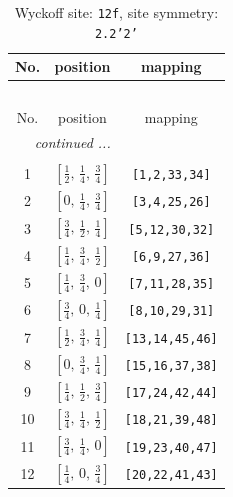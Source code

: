 \documentclass[fleqn,8pt]{jsarticle}
\begin{document}
\begin{longtable}{ccc}
\caption{Wyckoff site: {\tt 12f}, site symmetry: {\tt 2.2'2'}}
 \\
 \hline \hline
No. & position & mapping \\ \hline \endfirsthead

\multicolumn{2}{l}{\tablename\ \thetable{}} \\
 \hline \hline
No. & position & mapping \\ \hline \endhead

 \hline \hline
\multicolumn{2}{r}{\footnotesize\it continued ...} \\ \endfoot

 \hline \hline
\multicolumn{2}{r}{} \\ \endlastfoot

1 & $\left[ \frac{1}{2},\, \frac{1}{4},\, \frac{3}{4} \right]$ & {\tt [1,2,33,34]} \\ \hline
2 & $\left[ 0,\, \frac{1}{4},\, \frac{3}{4} \right]$ & {\tt [3,4,25,26]} \\ \hline
3 & $\left[ \frac{3}{4},\, \frac{1}{2},\, \frac{1}{4} \right]$ & {\tt [5,12,30,32]} \\ \hline
4 & $\left[ \frac{1}{4},\, \frac{3}{4},\, \frac{1}{2} \right]$ & {\tt [6,9,27,36]} \\ \hline
5 & $\left[ \frac{1}{4},\, \frac{3}{4},\, 0 \right]$ & {\tt [7,11,28,35]} \\ \hline
6 & $\left[ \frac{3}{4},\, 0,\, \frac{1}{4} \right]$ & {\tt [8,10,29,31]} \\ \hline
7 & $\left[ \frac{1}{2},\, \frac{3}{4},\, \frac{1}{4} \right]$ & {\tt [13,14,45,46]} \\ \hline
8 & $\left[ 0,\, \frac{3}{4},\, \frac{1}{4} \right]$ & {\tt [15,16,37,38]} \\ \hline
9 & $\left[ \frac{1}{4},\, \frac{1}{2},\, \frac{3}{4} \right]$ & {\tt [17,24,42,44]} \\ \hline
10 & $\left[ \frac{3}{4},\, \frac{1}{4},\, \frac{1}{2} \right]$ & {\tt [18,21,39,48]} \\ \hline
11 & $\left[ \frac{3}{4},\, \frac{1}{4},\, 0 \right]$ & {\tt [19,23,40,47]} \\ \hline
12 & $\left[ \frac{1}{4},\, 0,\, \frac{3}{4} \right]$ & {\tt [20,22,41,43]} \\
\end{longtable}
\renewcommand{\arraystretch}{1.2}
\end{document}
